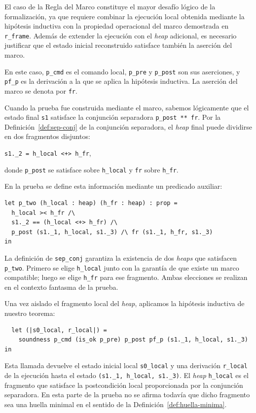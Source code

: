\documentclass[a4paper,	11pt]{report}
\begin{document}
El caso de la Regla del Marco constituye el mayor desafío lógico de la formalización,
ya que requiere combinar la ejecución local obtenida mediante la hipótesis inductiva con la propiedad operacional del marco demostrada en \lstinline|r_frame|.
Además de extender la ejecución con el \emph{heap} adicional,
es necesario justificar que el estado inicial reconstruido satisface también la aserción del marco.

En este caso,
\lstinline|p_cmd| es el comando local,
\lstinline|p_pre| y \lstinline|p_post| son sus aserciones,
y \lstinline|pf_p| es la derivación a la que se aplica la hipótesis inductiva.
La aserción del marco se denota por \lstinline|fr|.

Cuando la prueba fue construida mediante el marco,
sabemos lógicamente que el estado final \lstinline|s1| satisface la conjunción separadora \lstinline|p_post ** fr|.
Por la Definición~\ref{def:sep-conj} de la conjunción separadora,
el \emph{heap} final puede dividirse en dos fragmentos disjuntos:
\begin{center}
\lstinline|s1._2 = h_local <+> h_fr|,
\end{center}
donde \lstinline|p_post| se satisface sobre \lstinline|h_local| y \lstinline|fr| sobre \lstinline|h_fr|.

En la prueba se define esta información mediante un predicado auxiliar:

\begin{lstlisting}
let p_two (h_local : heap) (h_fr : heap) : prop =
  h_local >< h_fr /\
  s1._2 == (h_local <+> h_fr) /\
  p_post (s1._1, h_local, s1._3) /\ fr (s1._1, h_fr, s1._3)
in
\end{lstlisting}
La definición de \lstinline|sep_conj| garantiza la existencia de dos \emph{heaps} que satisfacen \lstinline|p_two|.
Primero se elige \lstinline|h_local| junto con la garantía de que existe un marco compatible;
luego se elige \lstinline|h_fr| para ese fragmento.
Ambas elecciones se realizan en el contexto fantasma de la prueba.

Una vez aislado el fragmento local del \emph{heap},
aplicamos la hipótesis inductiva de nuestro teorema:

\begin{lstlisting}
  let (|s0_local, r_local|) =
    soundness p_cmd (is_ok p_pre) p_post pf_p (s1._1, h_local, s1._3) in
\end{lstlisting}
Esta llamada devuelve el estado inicial local \lstinline|s0_local| y una derivación \lstinline|r_local| de la ejecución hasta el estado \lstinline|(s1._1, h_local, s1._3)|.
El \emph{heap} \lstinline|h_local| es el fragmento que satisface la postcondición local proporcionada por la conjunción separadora.
En esta parte de la prueba no se afirma todavía que dicho fragmento sea una huella minimal en el sentido de la Definición~\ref{def:huella-minima}.
\end{document}
